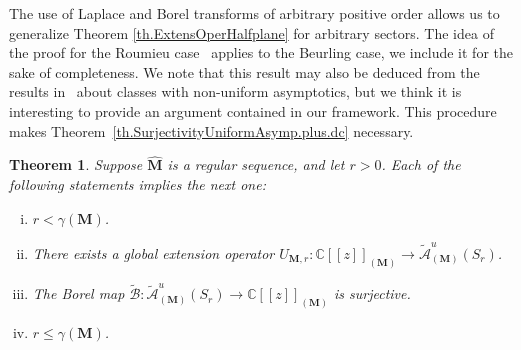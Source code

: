 \documentclass[11pt,a4paper]{article}
\theoremstyle{plain}
\newtheorem{theorem}{Theorem}[section]
\theoremstyle{definition}
\numberwithin{equation}{section}
\newcommand{\CC}{\mathbb{C}}
\newcommand{\M}{{\boldsymbol{M}}}
\newcommand{\hM}{\widehat{{\boldsymbol{M}}}}
\begin{document}
The use of Laplace and Borel transforms of arbitrary positive order allows us to generalize Theorem \ref{th.ExtensOperHalfplane} for arbitrary sectors. The idea of the proof for the Roumieu case~\cite[Th. 4.2]{JimenezSanzSchindlSurjectDC} applies to the Beurling case, we include it for the sake of completeness. We note that this result may also be deduced from the results in~\cite{DebrouwereBorelRittBeurlingClasses} about classes with non-uniform asymptotics, but we think it is interesting to provide an argument contained in our framework. This procedure makes Theorem~\ref{th.SurjectivityUniformAsymp.plus.dc} necessary.

\begin{theorem}\label{th.GlobalExtOperRegSeq}
	Suppose $\hM$ is a regular sequence, and let $r>0$. Each of the following statements implies the next one:
	\begin{enumerate}[(i)]
		\item $r<\gamma(\M)$.
		\item There exists a global extension operator $U_{\M,r}:\CC[[z]]_{(\M)}\to\widetilde{\mathcal{A}}^u_{(\M)}(S_{r})$.
		\item The Borel map $\widetilde{\mathcal{B}}:\widetilde{\mathcal{A}}^u_{(\M)}(S_{r})\to \CC[[z]]_{(\M)}$ is surjective.
		\item $r\le \gamma(\M)$.
	\end{enumerate}
\end{theorem}
\end{document}
